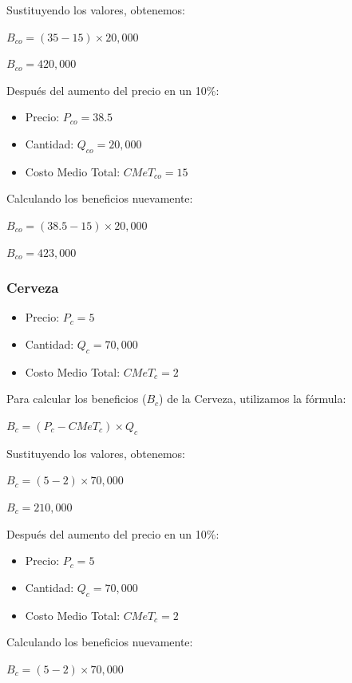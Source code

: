 \documentclass[
  a4paper,
]{article}
\providecommand{\tightlist}{%
  \setlength{\itemsep}{0pt}\setlength{\parskip}{0pt}}\usepackage{longtable,booktabs,array}
\begin{document}
Sustituyendo los valores, obtenemos:

\(B_{co} = (35 - 15) \times 20,000\)

\(B_{co} = 420,000\)

Después del aumento del precio en un 10\%:

\begin{itemize}
\tightlist
\item
  Precio: \(P_{co} = 38.5\)
\item
  Cantidad: \(Q_{co} = 20,000\)
\item
  Costo Medio Total: \(CMeT_{co} = 15\)
\end{itemize}

Calculando los beneficios nuevamente:

\(B_{co} = (38.5 - 15) \times 20,000\)

\(B_{co} = 423,000\)

\hypertarget{cerveza}{%
\subsubsection{Cerveza}\label{cerveza}}

\begin{itemize}
\tightlist
\item
  Precio: \(P_c = 5\)
\item
  Cantidad: \(Q_c = 70,000\)
\item
  Costo Medio Total: \(CMeT_c = 2\)
\end{itemize}

Para calcular los beneficios (\(B_c\)) de la Cerveza, utilizamos la
fórmula:

\(B_c = (P_c - CMeT_c) \times Q_c\)

Sustituyendo los valores, obtenemos:

\(B_c = (5 - 2) \times 70,000\)

\(B_c = 210,000\)

Después del aumento del precio en un 10\%:

\begin{itemize}
\tightlist
\item
  Precio: \(P_c = 5\)
\item
  Cantidad: \(Q_c = 70,000\)
\item
  Costo Medio Total: \(CMeT_c = 2\)
\end{itemize}

Calculando los beneficios nuevamente:

\(B_c = (5 - 2) \times 70,000\)
\end{document}

